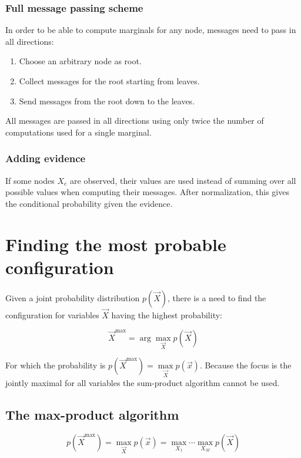		\subsubsection{Full message passing scheme}
		In order to be able to compute marginals for any node, messages need to pass in all directions:

		\begin{multicols}{2}
			\begin{enumerate}
				\item Choose an arbitrary node as root.
				\item Collect messages for the root starting from leaves.
				\item Send messages from the root down to the leaves.
			\end{enumerate}
		\end{multicols}

		All messages are passed in all directions using only twice the number of computations used for a single marginal.

		\subsubsection{Adding evidence}
		If some nodes $X_e$ are observed, their values are used instead of summing over all possible values when computing their messages.
		After normalization, this gives the conditional probability given the evidence.

\section{Finding the most probable configuration}
Given a joint probability distribution $p(\vec{X})$, there is a need to find the configuration for variables $\vec{X}$ having the highest probability:

$$\vec{X}^{\max} = \arg\max\limits_{\vec{X}}p(\vec{X})$$

For which the probability is $p(\vec{X}^{\max}) = \max\limits_{\vec{X}}p(\vec{x})$.
Because the focus is the jointly maximal for all variables the sum-product algorithm cannot be used.

	\subsection{The max-product algorithm}

	$$p(\vec{X}^{\max}) = \max\limits_{\vec{X}}p(\vec{x}) = \max\limits_{X_1}\cdots\max\limits_{X_M}p(\vec{X})$$

